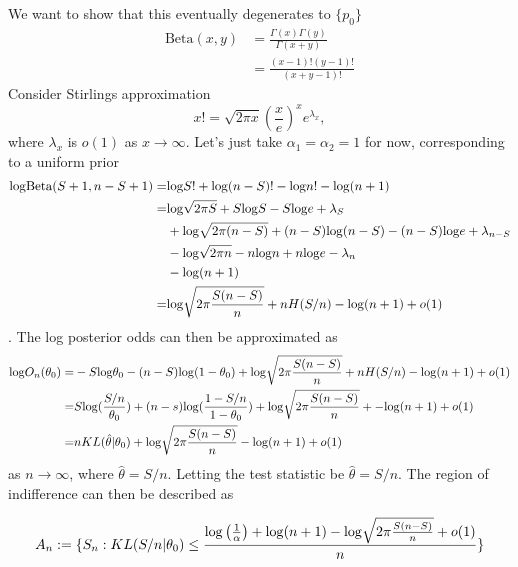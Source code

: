 \documentclass[11pt]{article}
\def\log{{\rm log}}
\begin{document}
We want to show that this eventually degenerates to $\lbrace p_0 \rbrace$
\begin{align}
  \text{Beta}(x, y) &= \frac{\Gamma(x)\Gamma(y)}{\Gamma(x+y)}\\
  &=\frac{(x-1)!(y-1)!}{(x+y-1)!}
\end{align}
Consider Stirlings approximation
\begin{equation}
  \label{eq:stirling}
  x! = \sqrt{2\pi x} \left( \frac{x}{e} \right)^x   e^{\lambda_x},
\end{equation}
where $\lambda_x$ is $o(1)$ as $x\rightarrow \infty$. Let's just take $\alpha_1=\alpha_2=1$ for now, corresponding to a uniform prior
\begin{align*}
  \log \text{Beta}(S + 1, n - S + 1) =& \log S! + \log (n-S)! - \log n!-\log (n+1)\\
                         =&  \log \sqrt{2\pi S} + S \log S - S \log e  + \lambda_{S}\\
                         &+ \log \sqrt{2\pi (n-S)} +(n-S) \log (n-S) - (n-S) \log e  + \lambda_{n-S}\\
  &- \log \sqrt{2\pi n} - n\log n + n \log e  - \lambda_{n}\\
  &- \log (n+1)\\
  =&  \log \sqrt{2\pi\frac{ S(n-S)}{n}} + n H(S/n) - \log(n+1) + o(1)
\end{align*}.
The log posterior odds can then be approximated as
\begin{align*}
  \log O_n(\theta_0) =&  -S \log \theta_0 - (n-S)\log (1-\theta_0) + \log \sqrt{2\pi\frac{ S(n-S)}{n}} + n H(S/n) - \log(n+1) + o(1)\\
  =&  S\log(\frac{S/n}{\theta_0})  + (n-s) \log(\frac{1-S/n}{1-\theta_0})+ \log \sqrt{2\pi\frac{ S(n-S)}{n}} + - \log(n+1) + o(1)\\
     =&  n KL(\hat{\theta}|\theta_0) +  \log \sqrt{2\pi\frac{ S(n-S)}{n}} - \log(n+1) + o(1)\\
\end{align*}
as $n \rightarrow \infty$, where $\hat{\theta}=S/n$. Letting the test statistic be $\hat{\theta}=S/n$. The region of indifference can then be described as

\begin{equation}
  A_n := \lbrace S_n : KL(S/n|\theta_0)  \leq \frac{\log\left(\frac{1}{\alpha}\right)+\log(n+1) - \log \sqrt{2\pi\frac{ S(n-S)}{n}} + o(1)}{n} \rbrace
\end{equation}
\end{document}
